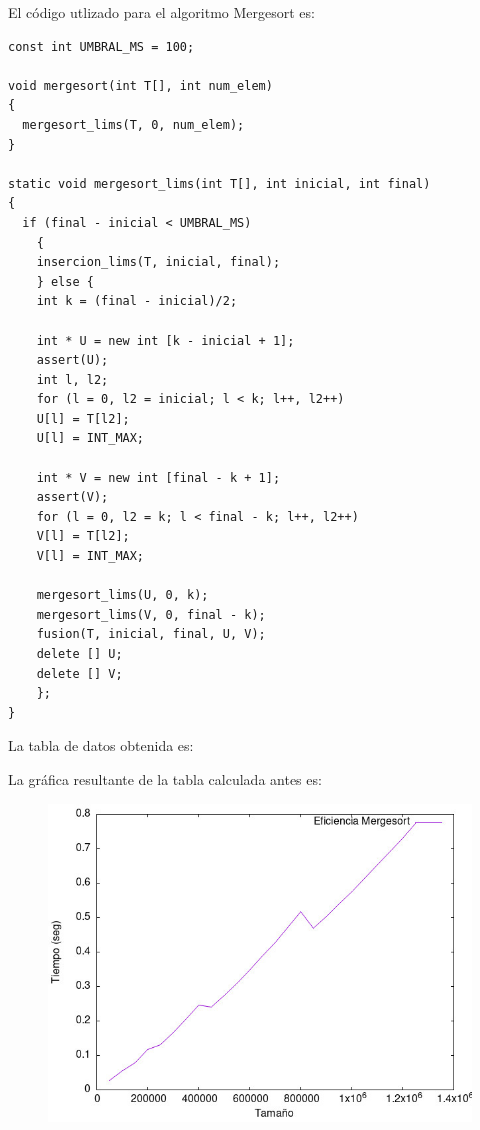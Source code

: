 \documentclass[12pt, spanish]{article}
\begin{document}
El código utlizado para el algoritmo Mergesort es:
\begin{verbatim}
const int UMBRAL_MS = 100;

void mergesort(int T[], int num_elem)
{
  mergesort_lims(T, 0, num_elem);
}

static void mergesort_lims(int T[], int inicial, int final)
{
  if (final - inicial < UMBRAL_MS)
	{
  	insercion_lims(T, inicial, final);
	} else {
  	int k = (final - inicial)/2;

  	int * U = new int [k - inicial + 1];
  	assert(U);
  	int l, l2;
  	for (l = 0, l2 = inicial; l < k; l++, l2++)
    U[l] = T[l2];
  	U[l] = INT_MAX;

  	int * V = new int [final - k + 1];
  	assert(V);
  	for (l = 0, l2 = k; l < final - k; l++, l2++)
    V[l] = T[l2];
  	V[l] = INT_MAX;

  	mergesort_lims(U, 0, k);
  	mergesort_lims(V, 0, final - k);
  	fusion(T, inicial, final, U, V);
  	delete [] U;
  	delete [] V;
	};
}
\end{verbatim}

\newpage

La tabla de datos obtenida es:


\newpage

La gráfica resultante de la tabla calculada antes es:
\begin{figure}[H]
  \centering
  \includegraphics[scale = 0.8]{mergesort.png}
\end{figure}
\end{document}
